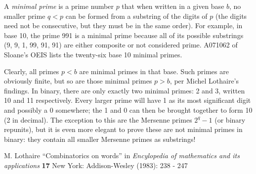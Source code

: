 \documentclass[12pt]{article}
\begin{document}
A {\em minimal prime} is a prime number $p$ that when written in a given base $b$, no smaller prime $q < p$ can be formed from a substring of the digits of $p$ (the digits need not be consecutive, but they must be in the same order). For example, in base 10, the prime 991 is a minimal prime because all of its possible substrings (9, 9, 1, 99, 91, 91) are either composite or not considered prime. A071062 of Sloane's OEIS lists the twenty-six base 10 minimal primes.

Clearly, all primes $p < b$ are minimal primes in that base. Such primes are obviously finite, but so are those minimal primes $p > b$, per Michel Lothaire's findings. In binary, there are only exactly two minimal primes: 2 and 3, written 10 and 11 respectively. Every larger prime will have 1 as its most significant digit and possibly a 0 somewhere; the 1 and 0 can then be brought together to form 10 (2 in decimal). The exception to this are the Mersenne primes $2^q - 1$ (or binary repunits), but it is even more elegant to prove these are not minimal primes in binary: they contain all smaller Mersenne primes as substrings!

\begin{thebibliography}{1}
 M. Lothaire ``Combinatorics on words'' in {\it Encylopedia of mathematics and its applications} {\bf 17} New York: Addison-Wesley (1983): 238 - 247
\end{thebibliography}
\end{document}
